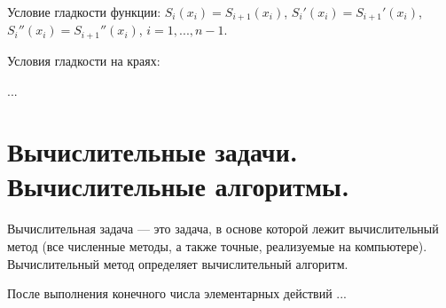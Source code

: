 \documentclass{article}
\begin{document}
Условие гладкости функции:
$S_i(x_i) = S_{i+1}(x_i)$,
$S_i'(x_i) = S_{i+1}'(x_i)$,
$S_i''(x_i) = S_{i+1}''(x_i)$,
$i = 1, ... ,n -1$.

Условия гладкости на краях:

...

\section{Вычислительные задачи. Вычислительные алгоритмы.}

Вычислительная задача --- это задача, в основе которой лежит вычислительный
метод (все численные методы, а также точные, реализуемые на компьютере).
Вычислительный метод определяет вычислительный алгоритм.

После выполнения конечного числа элементарных действий ...
\end{document}
